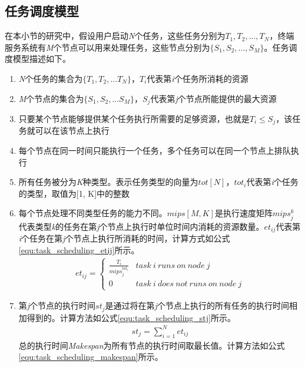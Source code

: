 \subsection{任务调度模型}
在本小节的研究中，假设用户启动\emph{N}个任务，这些任务分别为${T_1,T_2,...,T_N}$，终端服务系统有\emph{M}个节点可以用来处理任务，这些节点分别为$\{S_1,S_2,...,S_M\}$。任务调度模型描述如下。
\begin{enumerate}[]
    \item \emph{N}个任务的集合为$\{T_1,T_2,...T_N\}$，$T_i$代表第\emph{i}个任务所消耗的资源
    \item \emph{M}个节点的集合为$\{S_1,S_2,...S_M\}$，$S_j$代表第\emph{j}个节点所能提供的最大资源
    \item 只要某个节点能够提供某个任务执行所需要的足够资源，也就是$T_i \leq S_j$，该任务就可以在该节点上执行
    \item 每个节点在同一时间只能执行一个任务，多个任务可以在同一个节点上排队执行
    \item 所有任务被分为\emph{K}种类型。表示任务类型的向量为$tot[N]$，$tot_i$代表第\emph{i}个任务的类型，取值为[1, K]中的整数
    \item 每个节点处理不同类型任务的能力不同。$mips[M,K]$是执行速度矩阵$mips_{j}^{k}$ 代表类型\emph{k}的任务在第\emph{j}个节点上执行时单位时间内消耗的资源数量。$et_{ij}$代表第\emph{i}个任务在第\emph{j}个节点上执行所消耗的时间，计算方式如公式\ref{equ:task_scheduling_etij}所示。
    \begin{eqnarray}\label{equ:task_scheduling_etij}
        et_{ij}= \begin{cases}
            \frac{T_i}{mips_{j}^{tot_i}} & task\  i\  runs\  on\  node\  j \\
            0&task\  i\  does\  not\  runs\  on\  node\  j 
            \end{cases} 
    \end{eqnarray}
    \item 第\emph{j}个节点的执行时间$st_j$是通过将在第\emph{j}个节点上执行的所有任务的执行时间相加得到的。计算方法如公式\ref{equ:task_scheduling_stj}所示。
    \begin{eqnarray}\label{equ:task_scheduling_stj}
        st_{j}=\sum_{i=1}^{N} et_{ij}
    \end{eqnarray}
    总的执行时间\emph{Makespan}为所有节点的执行时间取最长值。计算方法如公式\ref{equ:task_scheduling_makespan}所示。

\end{enumerate}
